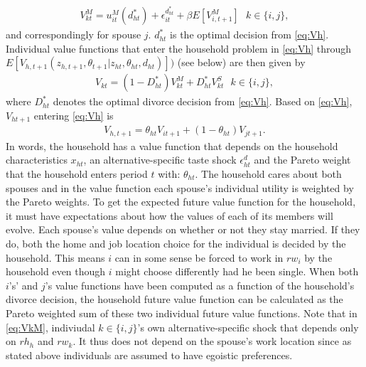 \begin{align}
V_{kt}^M=u_{it}^M(d_{ht}^*)+\epsilon_{it}^{d_{ht}^*}+\beta E[V_{i,t+1}^M] \text{ $k\in\{i,j\}$},
\label{eq:VkM}
\end{align}
and correspondingly for spouse $j$. $d_{ht}^*$ is the optimal decision from \eqref{eq:Vh}. Individual value functions that enter the household problem in \eqref{eq:Vh} through $E[V_{h,t+1}(z_{h,t+1},\theta_{t+1}|z_{ht},\theta_{ht},d_{ht})])$ (see below) are then given by
\begin{align}
V_{kt}=(1-D_{ht}^*)V_{kt}^M+D_{ht}^*V_{kt}^S \text{ }k\in\{i,j\},
\label{eq:Vi}
\end{align}
where $D_{ht}^*$ denotes the optimal divorce decision from \eqref{eq:Vh}.
Based on \eqref{eq:Vh}, $V_{ht+1}$ entering \eqref{eq:Vh} is 
\begin{align*}
V_{h,t+1}=\theta_{ht} V_{it+1}+(1-\theta_{ht})V_{jt+1}.
\end{align*}  
In words, the household has a value function that depends on the household characteristics $x_{ht}$, an alternative-specific taste shock $\epsilon_{ht}^d$ and the Pareto weight that the household enters period $t$ with: $\theta_{ht}$. The household cares about both spouses and in the value function each spouse's individual utility is weighted by the Pareto weights. To get the expected future value function for the household, it must have expectations about how the values of each of its members will evolve. Each spouse's value depends on whether or not they stay married. If they do, both the home and job location choice for the individual is decided by the household. This means $i$ can in some sense be forced to work in $rw_i$ by the household even though $i$ might choose differently had he been single. When both $i$'s' and $j$'s value functions have been computed as a function of the household's divorce decision, the household future value function can be calculated as the Pareto weighted sum of these two individual future value functions. Note that in \eqref{eq:VkM}, indiviudal $k\in\{i,j\}$'s own alternative-specific shock that depends only on $rh_h$ and $rw_k$. It thus does not depend on the spouse's work location since as stated above individuals are assumed to have egoistic preferences. 


